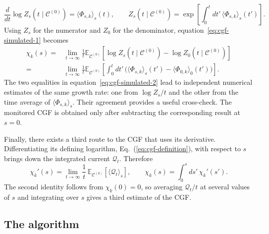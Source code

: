 \documentclass[11pt]{article}
\begin{document}
\[
    \frac{d}{dt}\log Z_s(t\mid\mathcal{C}^{(0)})
    =\langle\Phi_{s,k}\rangle_s(t),
    \qquad
    Z_s(t\mid\mathcal{C}^{(0)})
    =\exp\!\left[\int_0^t dt'\,
      \langle\Phi_{s,k}\rangle_s(t')\right].
\]
Using $Z_s$ for the numerator and $Z_0$ for the denominator, equation~\ref{eq:cgf-simulated-1} becomes
\begin{equation}
\begin{split}
    \chi_k(s)
    ={}&\lim_{t\to\infty}\frac{1}{t}
    \mathbb{E}_{\mathcal{C}^{(0)}}\!\left[
      \log Z_s(t\mid\mathcal{C}^{(0)})
      -\log Z_0(t\mid\mathcal{C}^{(0)})\right]\\
    ={}&\lim_{t\to\infty}\frac{1}{t}
    \mathbb{E}_{\mathcal{C}^{(0)}}\!\left[
      \int_0^t dt'\,
      \bigl(\langle\Phi_{s,k}\rangle_s(t')
      -\langle\Phi_{0,k}\rangle_0(t')\bigr)\right].
\end{split}
\label{eq:cgf-simulated-2}
\end{equation}
The two equalities in equation~\ref{eq:cgf-simulated-2} lead to independent numerical estimates of the same growth rate: one from $\log Z_s/t$ and the other from the time average of $\langle\Phi_{s,k}\rangle_s$. Their agreement provides a useful cross-check. The monitored CGF is obtained only after subtracting the corresponding result at $s=0$.

Finally, there exists a third route to the CGF that uses its derivative. Differentiating its defining logarithm, Eq.~(\ref{eq:cgf-definition}), with respect to $s$ brings down the integrated current $\mathcal{Q}_t$. Therefore
\begin{equation}
    \chi_k'(s)
    =\lim_{t\to\infty}\frac{1}{t}\,
      \mathbb{E}_{\mathcal{C}^{(0)}}\!\left[
      \bigl\langle\mathcal{Q}_t\bigr\rangle_{s}\right],
    \qquad
    \chi_k(s)=\int_0^s ds'\,\chi_k'(s').
    \label{eq:cgf-derivative}
\end{equation}
The second identity follows from $\chi_k(0)=0$, so averaging $\mathcal{Q}_t/t$ at several values of $s$ and integrating over $s$ gives a third estimate of the CGF.

\subsection{The algorithm}
\label{sec:algorithm}
\end{document}
